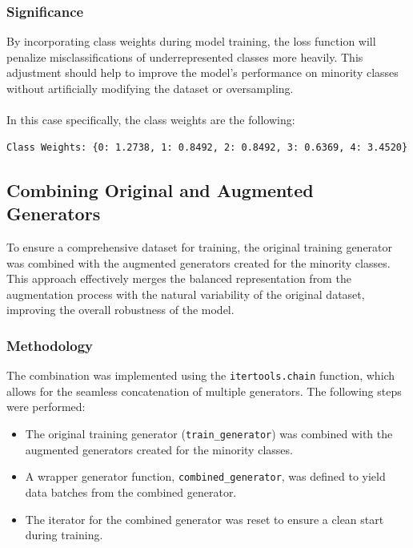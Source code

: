 \documentclass{article}
\begin{document}
\subsubsection{Significance}

By incorporating class weights during model training, the loss function will penalize misclassifications of underrepresented classes more heavily. This adjustment should help to improve the model's performance on minority classes without artificially modifying the dataset or oversampling.
\\\\
In this case specifically, the class weights are the following:

\begin{verbatim}
Class Weights: {0: 1.2738, 1: 0.8492, 2: 0.8492, 3: 0.6369, 4: 3.4520}
\end{verbatim}

\subsection{Combining Original and Augmented Generators}

To ensure a comprehensive dataset for training, the original training generator was combined with the augmented generators created for the minority classes. This approach effectively merges the balanced representation from the augmentation process with the natural variability of the original dataset, improving the overall robustness of the model.

\subsubsection{Methodology}

The combination was implemented using the \texttt{itertools.chain} function, which allows for the seamless concatenation of multiple generators. The following steps were performed:
\begin{itemize}
    \item The original training generator (\texttt{train\_generator}) was combined with the augmented generators created for the minority classes.
    \item A wrapper generator function, \texttt{combined\_generator}, was defined to yield data batches from the combined generator.
    \item The iterator for the combined generator was reset to ensure a clean start during training.
\end{itemize}
\end{document}
